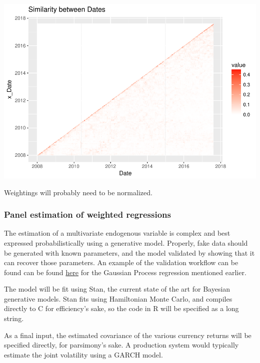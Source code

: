 \documentclass[]{article}
\begin{document}
\includegraphics{Econometric_FX_Forecasting_files/figure-latex/proxmat-1.pdf}

Weightings will probably need to be normalized.

\subsubsection{Panel estimation of weighted
regressions}\label{panel-estimation-of-weighted-regressions}

The estimation of a multivariate endogenous variable is complex and best
expressed probabilistically using a generative model. Properly, fake
data should be generated with known parameters, and the model validated
by showing that it can recover those parameters. An example of the
validation workflow can be found can be found
\href{https://charlesnaylor.github.io/gp_regression/doc/Specifying_the_Model-Full_Model.html}{here}
for the Gaussian Process regression mentioned earlier.

The model will be fit using Stan, the current state of the art for
Bayesian generative models. Stan fits using Hamiltonian Monte Carlo, and
compiles directly to C for efficiency's sake, so the code in R will be
specified as a long string.

As a final input, the estimated covariance of the various currency
returns will be specified directly, for parsimony's sake. A production
system would typically estimate the joint volatility using a GARCH
model.
\end{document}
